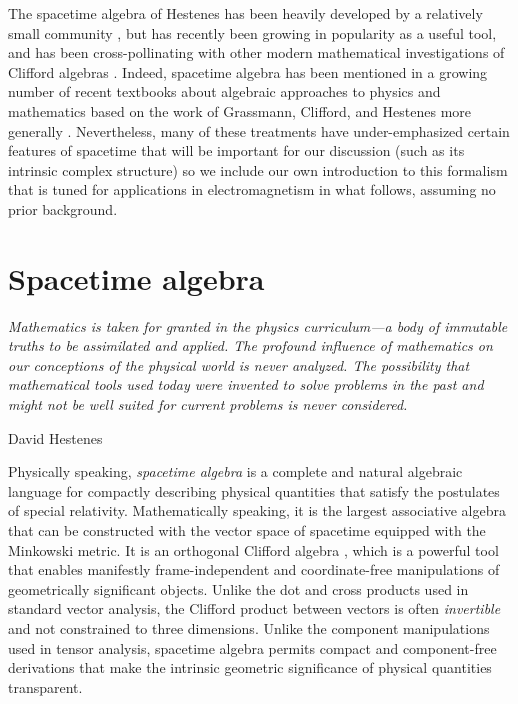 \documentclass[1p,sort&compress]{elsarticle}
\numberwithin{equation}{section}
\newcommand\epigraph[3]{
\vspace{1em}\hfill{}\begin{minipage}{#1}{\begin{spacing}{0.9}
\small\noindent\textit{#2}\end{spacing}
\vspace{1em}
\hfill{}{#3}}\vspace{2em}
\end{minipage}}
\begin{document}
The spacetime algebra of Hestenes has been heavily developed by a relatively small community \cite{Hestenes2003,Hestenes2003b,Hestenes2005,Hestenes1968,Hestenes1968b,Hestenes1971,Sobczyk1989,Lasenby1998,Ablamowicz2004,DeSabbata2007,VanEnk2013}, but has recently been growing in popularity as a useful tool, and has been cross-pollinating with other modern mathematical investigations of Clifford algebras \cite{Crumeyrolle1990,Colombo2004,Delanghe2012}.  Indeed, spacetime algebra has been mentioned in a growing number of recent textbooks about algebraic approaches to physics and mathematics based on the work of Grassmann, Clifford, and Hestenes more generally \cite{Hestenes1987,Doran2007,Baylis1996,Hestenes1999,Corrochano2001,Baylis2002,Perwass2010,Dorst2011,Macdonald2011,Macdonald2012}.  Nevertheless, many of these treatments have under-emphasized certain features of spacetime that will be important for our discussion (such as its intrinsic complex structure) so we include our own introduction to this formalism that is tuned for applications in electromagnetism in what follows, assuming no prior background.


\section{Spacetime algebra}\label{sec:algebra}

\epigraph{4.5in}{Mathematics is taken for granted in the physics curriculum---a body of immutable truths to be assimilated and applied. The profound influence of mathematics on our conceptions of the physical world is never analyzed. The possibility that mathematical tools used today were invented to solve problems in the past and might not be well suited for current problems is never considered.}{David Hestenes \cite{Hestenes2003}}


Physically speaking, \emph{spacetime algebra} \cite{Hestenes1966,Hestenes1987,Hestenes2003,Hestenes2003b} is a complete and natural algebraic language for compactly describing physical quantities that satisfy the postulates of special relativity.  Mathematically speaking, it is the largest associative algebra that can be constructed with the vector space of spacetime equipped with the Minkowski metric.  It is an orthogonal Clifford algebra \cite{Crumeyrolle1990}, which is a powerful tool that enables manifestly frame-independent and coordinate-free manipulations of geometrically significant objects.  Unlike the dot and cross products used in standard vector analysis, the Clifford product between vectors is often \emph{invertible} and not constrained to three dimensions.  Unlike the component manipulations used in tensor analysis, spacetime algebra permits compact and component-free derivations that make the intrinsic geometric significance of physical quantities transparent.  
\end{document}
